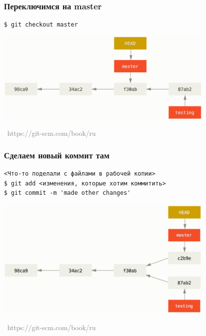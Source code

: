 \documentclass[xetex,mathserif,serif]{beamer}
\newcommand{\attribution}[1] {
    \vspace{-5mm}\begin{flushright}\begin{scriptsize}\textcolor{gray}{\textcopyright\, #1}\end{scriptsize}\end{flushright}
}
\begin{document}
    \begin{frame}[fragile]
        \frametitle{Переключимся на master}
        \begin{verbatim}
$ git checkout master
        \end{verbatim}
        \begin{center}
            \includegraphics[width=0.8\textwidth]{checkoutToMaster.png}
            \attribution{https://git-scm.com/book/ru}
        \end{center}
    \end{frame}

    \begin{frame}[fragile]
        \frametitle{Сделаем новый коммит там}
        \begin{verbatim}
<Что-то поделали с файлами в рабочей копии>
$ git add <изменения, которые хотим коммитить>
$ git commit -m 'made other changes'
        \end{verbatim}
        \begin{center}
            \includegraphics[width=0.8\textwidth]{newCommitToMaster.png}
            \attribution{https://git-scm.com/book/ru}
        \end{center}
    \end{frame}
\end{document}
